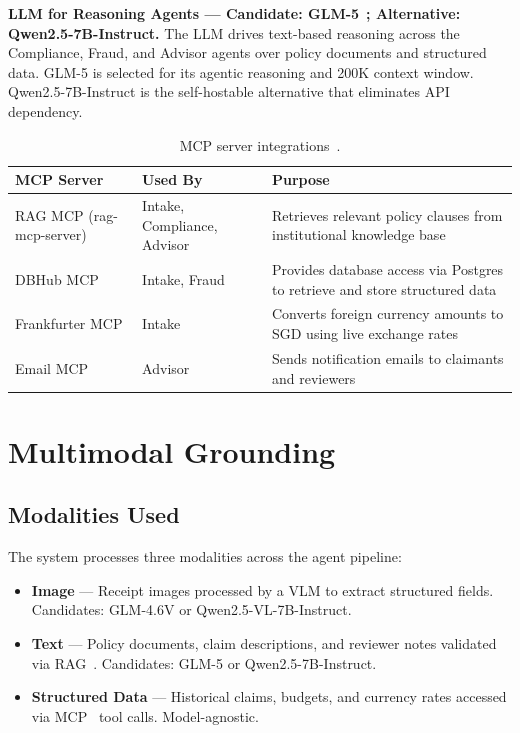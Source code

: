 \documentclass{article}
\begin{document}
\textbf{LLM for Reasoning Agents --- Candidate: GLM-5}~\cite{glm5_2026}\textbf{; Alternative: Qwen2.5-7B-Instruct.}
The LLM drives text-based reasoning across the Compliance, Fraud, and Advisor agents over policy documents and structured data. GLM-5 is selected for its agentic reasoning and 200K context window. Qwen2.5-7B-Instruct is the self-hostable alternative that eliminates API dependency.

\begin{table}[h]
  \centering
  \caption{MCP server integrations~\cite{mcp2024}.}
  \label{tab:mcp}
  \small
  \begin{tabularx}{\textwidth}{@{}>{\raggedright\arraybackslash}p{2.25cm} >{\raggedright\arraybackslash}p{2.55cm} X@{}}
    \toprule
    \textbf{MCP Server} & \textbf{Used By} & \textbf{Purpose} \\
    \midrule
    RAG MCP (rag-mcp-server) & Intake, Compliance, Advisor & Retrieves relevant policy clauses from institutional knowledge base \\
    DBHub MCP & Intake, Fraud & Provides database access via Postgres to retrieve and store structured data \\
    Frankfurter MCP & Intake & Converts foreign currency amounts to SGD using live exchange rates \\
    Email MCP & Advisor & Sends notification emails to claimants and reviewers \\
    \bottomrule
  \end{tabularx}
\end{table}

\section{Multimodal Grounding}
\label{sec:multimodal}

\subsection{Modalities Used}
\label{sec:modalities}

The system processes three modalities across the agent pipeline:

\begin{itemize}[leftmargin=*,itemsep=0pt]
  \item \textbf{Image} --- Receipt images processed by a VLM to extract structured fields. Candidates: GLM-4.6V or Qwen2.5-VL-7B-Instruct.
  \item \textbf{Text} --- Policy documents, claim descriptions, and reviewer notes validated via RAG~\cite{lewis2020rag}. Candidates: GLM-5 or Qwen2.5-7B-Instruct.
  \item \textbf{Structured Data} --- Historical claims, budgets, and currency rates accessed via MCP~\cite{mcp2024} tool calls. Model-agnostic.
\end{itemize}
\end{document}
